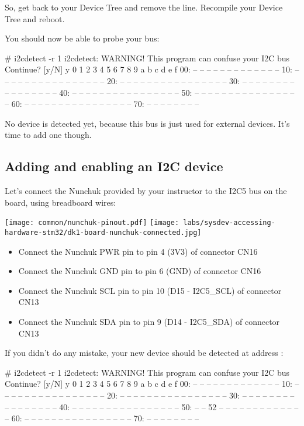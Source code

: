 {So, get back to your Device Tree and remove the 
line. Recompile your Device Tree and reboot.

You should now be able to probe your bus:

\begin{bashinput}
# i2cdetect -r 1
i2cdetect: WARNING! This program can confuse your I2C bus
Continue? [y/N] y
     0  1  2  3  4  5  6  7  8  9  a  b  c  d  e  f
00:          -- -- -- -- -- -- -- -- -- -- -- -- --
10: -- -- -- -- -- -- -- -- -- -- -- -- -- -- -- --
20: -- -- -- -- -- -- -- -- -- -- -- -- -- -- -- --
30: -- -- -- -- -- -- -- -- -- -- -- -- -- -- -- --
40: -- -- -- -- -- -- -- -- -- -- -- -- -- -- -- --
50: -- -- -- -- -- -- -- -- -- -- -- -- -- -- -- --
60: -- -- -- -- -- -- -- -- -- -- -- -- -- -- -- --
70: -- -- -- -- -- -- -- --
\end{bashinput}

No device is detected yet, because this bus is just
used for external devices. It's time to add one though.

\subsection{Adding and enabling an I2C device}

Let's connect the Nunchuk provided by your instructor
to the I2C5 bus on the board, using breadboard wires:

\texttt{[image: common/nunchuk-pinout.pdf]}
\texttt{[image: labs/sysdev-accessing-hardware-stm32/dk1-board-nunchuk-connected.jpg]}

\begin{itemize}
\item Connect the Nunchuk PWR pin to pin 4 (3V3) of connector CN16
\item Connect the Nunchuk GND pin to pin 6 (GND) of connector CN16
\item Connect the Nunchuk SCL pin to pin 10 (D15 - I2C5\_SCL) of connector CN13
\item Connect the Nunchuk SDA pin to pin 9 (D14 - I2C5\_SDA) of connector CN13
\end{itemize}

If you didn't do any mistake, your new device should be detected at
address :

\begin{bashinput}
# i2cdetect -r 1
i2cdetect: WARNING! This program can confuse your I2C bus
Continue? [y/N] y
     0  1  2  3  4  5  6  7  8  9  a  b  c  d  e  f
00:          -- -- -- -- -- -- -- -- -- -- -- -- --
10: -- -- -- -- -- -- -- -- -- -- -- -- -- -- -- --
20: -- -- -- -- -- -- -- -- -- -- -- -- -- -- -- --
30: -- -- -- -- -- -- -- -- -- -- -- -- -- -- -- --
40: -- -- -- -- -- -- -- -- -- -- -- -- -- -- -- --
50: -- -- 52 -- -- -- -- -- -- -- -- -- -- -- -- --
60: -- -- -- -- -- -- -- -- -- -- -- -- -- -- -- --
70: -- -- -- -- -- -- -- --
\end{bashinput}

}
